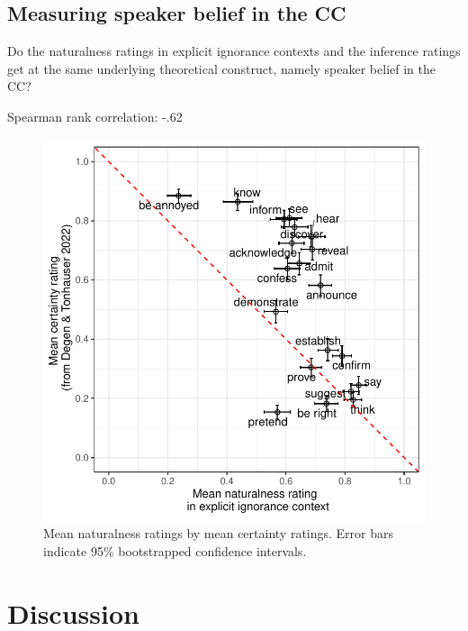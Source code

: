 \documentclass[11pt,fleqn]{article}
\newcommand{\6}{\mbox{$[\hspace*{-.6mm}[$}}
\newcommand{\9}{\mbox{$]\hspace*{-.6mm}]$}}
\begin{document}
\subsection{Measuring speaker belief in the CC}

Do the naturalness ratings in explicit ignorance contexts and the inference ratings get at the same underlying theoretical construct, namely speaker belief in the CC?

Spearman rank correlation: -.62


\begin{figure}[h!]
\centering
\includegraphics[width=.7\textwidth]{../../results/main/13explicitIgnorance/graphs/mean-acceptability-against-mean-certainty}
\caption{Mean naturalness ratings by mean certainty ratings. Error bars indicate 95\% bootstrapped confidence intervals.}\label{fig:acc-by-certain}
\end{figure}

%
%
\section{Discussion}\label{s4}



\end{document}
